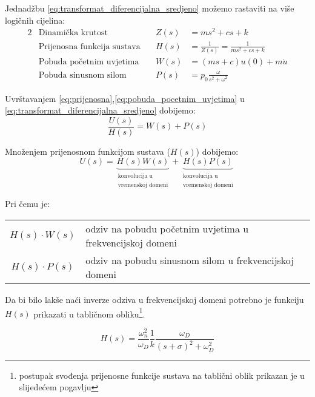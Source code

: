 Jednadžbu \eqref{eq:transformat_diferencijalna_sredjeno} možemo rastaviti na više logičnih
cijelina:
\begin{alignat}{2}
    &\text{Dinamička krutost} & Z(s)&=ms^2+cs+k\label{eq:din_krutost}\\
    &\text{Prijenosna funkcija sustava}\quad & H(s)&=\frac{1}{Z(s)}=\frac{1}{ms^2+cs+k}\label{eq:prijenosna}\\
    &\text{Pobuda početnim uvjetima}\quad & W(s)&=(ms+c)u(0)+m\dot{u}\label{eq:pobuda_pocetni}\\
    &\text{Pobuda sinusnom silom} & P(s)&=p_0\frac{\omega}{s^2+\omega^2}\label{eq:pobuda_sinusna}
\end{alignat}

Uvrštavanjem \eqref{eq:prijenosna},\eqref{eq:pobuda_pocetnim_uvjetima} u 
\eqref{eq:transformat_diferencijalna_sredjeno} dobijemo:
\begin{equation*}
	\frac{U(s)}{H(s)}=W(s)+P(s)
\end{equation*}

Množenjem prijenosnom funkcijom sustava ($H(s)$) dobijemo:
\begin{equation}
	U(s)=\underbrace{H(s)W(s)}_{\substack{\text{konvolucija u}\\\text{vremenskoj
	domeni}}}
	+ 
	\underbrace{H(s)P(s)}_{\substack{\text{konvolucija u}\\\text{vremenskoj domeni}}}
\end{equation}

Pri čemu je:
\begin{table}[H]
\begin{tabular}{c l}
	$H(s)\cdot W(s)$ & odziv na pobudu početnim uvjetima u frekvencijskoj domeni\\
	$H(s)\cdot P(s)$ & odziv na pobudu sinusnom silom u frekvencijskoj domeni\\
\end{tabular}
\end{table}

Da bi bilo lakše naći inverze odziva u frekvencijskoj domeni potrebno je funkciju  
$H(s)$ prikazati u tabličnom obliku\footnote{postupak svođenja prijenosne funkcije
sustava na tablični oblik prikazan je u slijedećem pogavlju}.

\begin{equation}\label{eq:pfs_tablicni_oblik}
    H(s) = \frac{\omega_n^2}{\omega_D}
           \frac{1}{k}
           \frac{\omega_D}{(s+\sigma)^2+\omega_D^2}
\end{equation}


